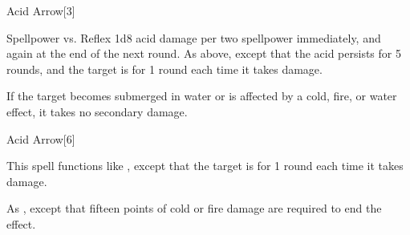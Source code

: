 \begin{spellsection}{Acid Arrow}[3]
    \begin{spellheader}
    \end{spellheader}
    \begin{spellcontent}
        \begin{spelltargetinginfo}
        \end{spelltargetinginfo}
        \begin{spelleffects}
            \begin{spellattack}{Spellpower vs. Reflex}
                \spellsuccess 1d8 acid damage per two spellpower immediately, and again at the end of the next round.
                \spellcritical As above, except that the acid persists for 5 rounds, and the target is \sickened for 1 round each time it takes damage.
            \end{spellattack}
        \end{spelleffects}
    \end{spellcontent}
    \begin{spellfooter}
        \spellnotes If the target becomes submerged in water or is affected by a cold, fire, or water effect, it takes no secondary damage.

        \physicalspellnotes
        \miscastrandom
    \end{spellfooter}
\end{spellsection}

\begin{spellsection}[Greater]{Acid Arrow}[6]
    \begin{spellheader}
    \end{spellheader}
    \begin{spellcontent}
        \begin{spelltargetinginfo}
        \end{spelltargetinginfo}
        \begin{spelleffects}
            \spellspecial This spell functions like , except that the target is \staggered for 1 round each time it takes damage.
        \end{spelleffects}
    \end{spellcontent}
    \begin{spellfooter}
        \spellnotes As , except that fifteen points of cold or fire damage are required to end the effect.
        \miscastrandom
    \end{spellfooter}
\end{spellsection}

